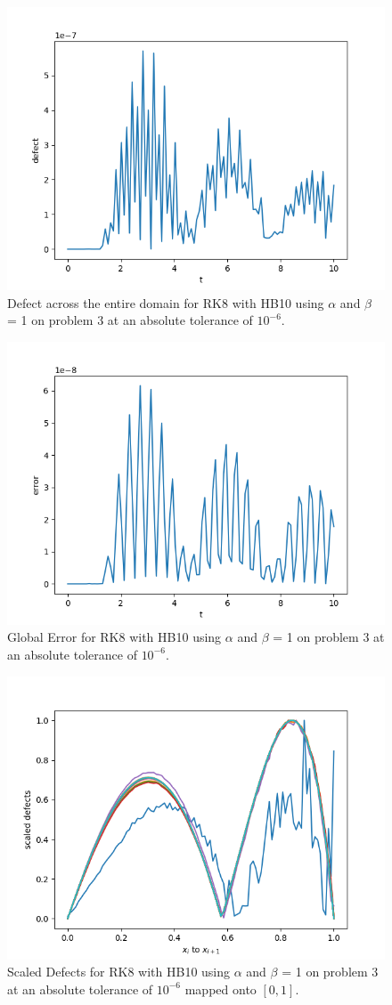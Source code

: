 \begin{figure}[H]
\centering
\includegraphics[width=0.7\linewidth]{./figures/static_alpha_rk8_with_hb10_p3_global_defect}
\caption{Defect across the entire domain for RK8 with HB10 using $\alpha$ and $\beta$ = 1 on problem 3 at an absolute tolerance of $10^{-6}$.}
\label{fig:static_alpha_rk8_with_hb10_p3_global_defect}
\end{figure}

\begin{figure}[H]
\centering
\includegraphics[width=0.7\linewidth]{./figures/static_alpha_rk8_with_hb10_p3_global_error}
\caption{Global Error for RK8 with HB10 using $\alpha$ and $\beta$ = 1 on problem 3 at an absolute tolerance of $10^{-6}$.}
\label{fig:static_alpha_rk8_with_hb10_p3_global_error}
\end{figure}

\begin{figure}[H]
\centering
\includegraphics[width=0.7\linewidth]{./figures/static_alpha_rk8_with_hb10_p3_scaled_defects}
\caption{Scaled Defects for RK8 with HB10 using $\alpha$ and $\beta$ = 1 on problem 3 at an absolute tolerance of $10^{-6}$ mapped onto $[0, 1]$.}
\label{fig:static_alpha_rk8_with_hb10_p3_scaled_defects}
\end{figure}


